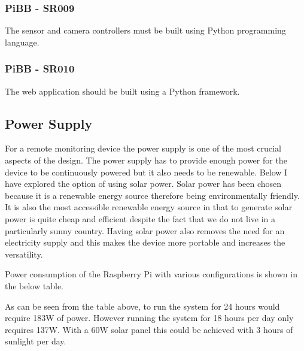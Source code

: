 \documentclass[10pt,a4paper]{article}
\begin{document}
\subsubsection{PiBB - SR009}
The sensor and camera controllers must be built using Python programming language.
\subsubsection{PiBB - SR010}
The web application should be built using a Python framework.
\subsection{Power Supply}
For a remote monitoring device the power supply is one of the most crucial aspects of the design. The power supply has to provide enough power for the device to be continuously powered but it also needs to be renewable. Below I have explored the option of using solar power.
Solar power has been chosen because it is a renewable energy source therefore being environmentally friendly. It is also the most accessible renewable energy source in that to generate solar power is quite cheap and efficient despite the fact that we do not live in a particularly sunny country. Having solar power also removes the need for an electricity supply and this makes the device more portable and increases the versatility. 

Power consumption of the Raspberry Pi with various configurations is shown in the below table. 

\begin{table}
  \centering
  \caption{Monitoring system power requirements}
  \label{tab:powerRequirements}
  \end{table}

As can be seen from the table above, to run the system for 24 hours would require 183W of power. However running the system for 18 hours per day only requires 137W. With a 60W solar panel this could be achieved with 3 hours of sunlight per day. 
\end{document}
